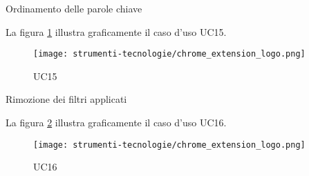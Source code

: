 \begin{usecase}{15}{Ordinamento delle parole chiave}\label{UC15}
\end{usecase}

\vspace{10pt}
\par\noindent
\begin{minipage}{\textwidth}
    La figura \ref{fig:uc15} illustra graficamente il caso d'uso UC15.
    \begin{figure}[H]
        \centering
        \texttt{[image: strumenti-tecnologie/chrome\_extension\_logo.png]} 
        \caption{UC15}
        \label{fig:uc15}
    \end{figure}
\end{minipage}

\begin{usecase}{16}{Rimozione dei filtri applicati}\label{UC16}
\end{usecase}

\vspace{10pt}
\par\noindent
\begin{minipage}{\textwidth}
    La figura \ref{fig:uc16} illustra graficamente il caso d'uso UC16.
    \begin{figure}[H]
        \centering
        \texttt{[image: strumenti-tecnologie/chrome\_extension\_logo.png]} 
        \caption{UC16}
        \label{fig:uc16}
    \end{figure}
\end{minipage}


